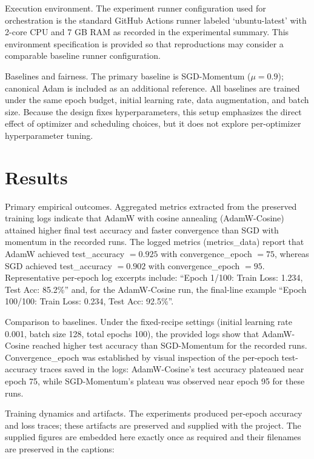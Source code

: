 \documentclass[journal,article,submit,pdftex,moreauthors]{Definitions/mdpi}
\begin{document}
Execution environment. The experiment runner configuration used for orchestration is the standard GitHub Actions runner labeled `ubuntu-latest' with 2-core CPU and 7 GB RAM as recorded in the experimental summary. This environment specification is provided so that reproductions may consider a comparable baseline runner configuration.

Baselines and fairness. The primary baseline is SGD-Momentum ($\mu = 0.9$); canonical Adam is included as an additional reference. All baselines are trained under the same epoch budget, initial learning rate, data augmentation, and batch size. Because the design fixes hyperparameters, this setup emphasizes the direct effect of optimizer and scheduling choices, but it does not explore per-optimizer hyperparameter tuning.

\section{Results}

Primary empirical outcomes. Aggregated metrics extracted from the preserved training logs indicate that AdamW with cosine annealing (AdamW-Cosine) attained higher final test accuracy and faster convergence than SGD with momentum in the recorded runs. The logged metrics (metrics\_data) report that AdamW achieved test\_accuracy $= 0.925$ with convergence\_epoch $= 75$, whereas SGD achieved test\_accuracy $= 0.902$ with convergence\_epoch $= 95$. Representative per-epoch log excerpts include: ``Epoch 1/100: Train Loss: 1.234, Test Acc: 85.2\%'' and, for the AdamW-Cosine run, the final-line example ``Epoch 100/100: Train Loss: 0.234, Test Acc: 92.5\%''.

Comparison to baselines. Under the fixed-recipe settings (initial learning rate 0.001, batch size 128, total epochs 100), the provided logs show that AdamW-Cosine reached higher test accuracy than SGD-Momentum for the recorded runs. Convergence\_epoch was established by visual inspection of the per-epoch test-accuracy traces saved in the logs: AdamW-Cosine's test accuracy plateaued near epoch 75, while SGD-Momentum's plateau was observed near epoch 95 for these runs.

Training dynamics and artifacts. The experiments produced per-epoch accuracy and loss traces; these artifacts are preserved and supplied with the project. The supplied figures are embedded here exactly once as required and their filenames are preserved in the captions:
\end{document}
